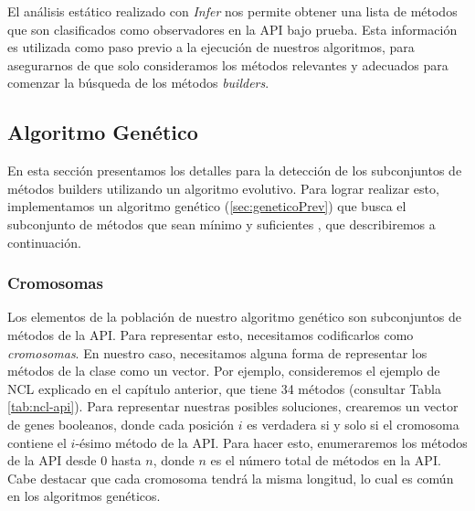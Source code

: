 El análisis estático realizado con \emph{Infer} nos permite obtener una lista de
métodos que son clasificados como observadores en la API bajo prueba. Esta
información es utilizada como paso previo a la ejecución de nuestros algoritmos,
para asegurarnos de que solo consideramos los métodos relevantes y adecuados
para comenzar la búsqueda de los métodos \emph{builders}. 

\subsection{Algoritmo Genético}
\label{alg:approachGA}


En esta sección presentamos los detalles para la detección de los subconjuntos
de métodos builders utilizando un algoritmo evolutivo. Para lograr realizar
esto, implementamos un algoritmo genético (\ref{sec:geneticoPrev}) que busca el
subconjunto de métodos que sean mínimo y suficientes , que describiremos a continuación.






\subsubsection{Cromosomas}
\label{ge:cromosomas}

Los elementos de la población de nuestro algoritmo genético son subconjuntos de métodos de la API. Para representar esto, necesitamos codificarlos como \emph{cromosomas}. En nuestro caso, necesitamos alguna forma de representar los métodos de la clase como un vector. Por ejemplo, consideremos el ejemplo de NCL explicado en el capítulo anterior, que tiene 34 métodos (consultar Tabla \ref{tab:ncl-api}). Para representar nuestras posibles soluciones, crearemos un vector de genes booleanos, donde cada posición $i$ es verdadera si y solo si el cromosoma contiene el $i$-ésimo método de la API. Para hacer esto, enumeraremos los métodos de la API desde 0 hasta $n$, donde $n$ es el número total de métodos en la API. Cabe destacar que cada cromosoma tendrá la misma longitud, lo cual es común en los algoritmos genéticos.

